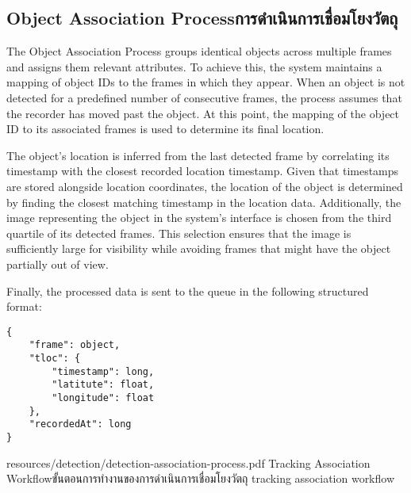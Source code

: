 \subsection{\ifenglish Object Association Process\else การดำเนินการเชื่อมโยงวัตถุ\fi}
The Object Association Process groups identical objects across multiple frames and assigns them relevant attributes. To achieve this, the system maintains a mapping of object IDs to the frames in which they appear. When an object is not detected for a predefined number of consecutive frames, the process assumes that the recorder has moved past the object. At this point, the mapping of the object ID to its associated frames is used to determine its final location.

The object's location is inferred from the last detected frame by correlating its timestamp with the closest recorded location timestamp. Given that timestamps are stored alongside location coordinates, the location of the object is determined by finding the closest matching timestamp in the location data. Additionally, the image representing the object in the system's interface is chosen from the third quartile of its detected frames. This selection ensures that the image is sufficiently large for visibility while avoiding frames that might have the object partially out of view.

Finally, the processed data is sent to the queue in the following structured format:
\begin{lstlisting}
{
    "frame": object,
    "tloc": {
        "timestamp": long,
        "latitute": float,
        "longitude": float
    },
    "recordedAt": long
}
\end{lstlisting}

\insertPDFfigure
{resources/detection/detection-association-process.pdf}
{\ifenglish Tracking Association Workflow\else ขั้นตอนการทำงานของการดำเนินการเชื่อมโยงวัตถุ\fi}
{tracking association workflow}